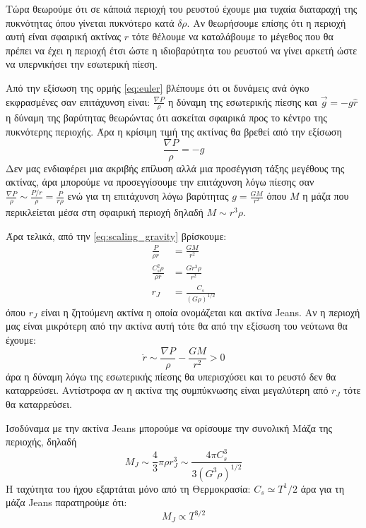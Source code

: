\documentclass[a4paper,11pt]{memoir}
\begin{document}
Τώρα θεωρούμε ότι σε κάποιά περιοχή του ρευστού έχουμε μια τυχαία διαταραχή της πυκνότητας όπου γίνεται πυκνότερο κατά $\delta \rho$. Αν θεωρήσουμε επίσης ότι η περιοχή αυτή είναι σφαιρική ακτίνας $r$ τότε θέλουμε να καταλάβουμε το μέγεθος που θα πρέπει να έχει η περιοχή έτσι ώστε η ιδιοβαρύτητα του ρευστού να γίνει αρκετή ώστε να υπερνικήσει την εσωτερική πίεση.

Από την εξίσωση της ορμής \ref{eq:euler} βλέπουμε ότι οι δυνάμεις ανά όγκο εκφρασμένες σαν επιτάχυνση είναι: $\frac{\nabla P}{\rho}$ η δύναμη της εσωτερικής πίεσης και $\vec{g}=-g \hat{r}$ η δύναμη της βαρύτητας θεωρώντας ότι ασκείται σφαιρικά προς το κέντρο της πυκνότερης περιοχής.
Άρα η κρίσιμη τιμή της ακτίνας θα βρεθεί από την εξίσωση
\begin{equation} 
\label{eq:scaling_gravity}
\frac{\nabla P}{\rho} =-g
\end{equation}
Δεν μας ενδιαφέρει μια ακριβής επίλυση αλλά μια προσέγγιση τάξης μεγέθους της ακτίνας, άρα μπορούμε να προσεγγίσουμε την επιτάχυνση λόγω πίεσης σαν $\frac{\nabla P}{\rho} \sim \frac{P/r}{\rho}=\frac{P}{r \rho}$ ενώ για τη επιτάχυνση λόγω βαρύτητας $g=\frac{GM}{r^2}$ όπου $M$ η μάζα που περικλείεται μέσα στη σφαιρική περιοχή δηλαδή $M \sim r^3 \rho$.

Άρα τελικά, από την \ref{eq:scaling_gravity} βρίσκουμε:
\begin{align}
\frac{P}{\rho r} &= \frac{GM}{r^2} \\
\frac{C_s ^2 \rho}{\rho r} &= \frac{Gr^3 \rho}{r^2} \\
r_J&=\frac{C_s}{(G \rho)^{1/2}}
\end{align}
όπου $r_{J}$ είναι η ζητούμενη ακτίνα η οποία ονομάζεται και ακτίνα Jeans. Αν η περιοχή μας είναι μικρότερη από την ακτίνα αυτή τότε θα από την εξίσωση του νεύτωνα θα έχουμε: 
\begin{equation}
\label{eq:newton}
\ddot{r} \sim \frac{\nabla P}{\rho} -\frac{GM}{r^2} > 0
\end{equation}
άρα η δύναμη λόγω της εσωτερικής πίεσης θα υπερισχύσει και το ρευστό δεν θα καταρρεύσει. Αντίστροφα αν η ακτίνα της συμπύκνωσης είναι μεγαλύτερη από $r_J$ τότε θα καταρρεύσει.

Ισοδύναμα με την ακτίνα Jeans μπορούμε να ορίσουμε την συνολική Μάζα της περιοχής, δηλαδή
\begin{equation}
\boxed{M_J \sim \frac{4}{3} \pi \rho r_J ^3 \sim \frac{4\pi C_s ^3}{3 (G^3 \rho)^{1/2}}}
\end{equation}
Η ταχύτητα του ήχου εξαρτάται μόνο από τη Θερμοκρασία: $C_s \simeq T^1/2$ άρα για τη μάζα Jeans παρατηρούμε ότι:
\begin{equation}
M_J \propto T^{3/2}
\end{equation}
\end{document}
